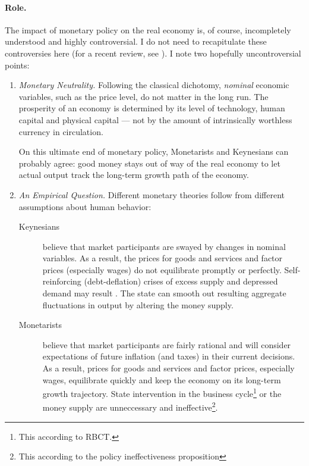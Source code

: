 \paragraph[Role]{Role.} %
The impact of monetary policy on the real economy is, of course, incompletely understood and highly controversial. I do not need to recapitulate these controversies here (for a recent review, see \citealt{Wapshott2011}). I note two hopefully uncontroversial points:

\begin{enumerate}
	\item \emph{Monetary Neutrality.} \label{it:monetary_neutrality} Following the classical dichotomy, \emph{nominal} economic variables, such as the price level, do not matter in the long run. The prosperity of an economy is determined by its level of technology, human capital and physical capital --- not by the amount of intrinsically worthless currency in circulation. 
	
	On this ultimate end of monetary policy, Monetarists and Keynesians can probably agree: good money stays out of way of the real economy to let actual output track the long-term growth path of the economy.

	\item \emph{An Empirical Question.} Different monetary theories follow from different assumptions about human behavior:

	\begin{description}
		\item[Keynesians] believe that market participants are swayed by changes in nominal variables. As a result, the prices for goods and services and factor prices (especially wages) do not equilibrate promptly or perfectly. Self-reinforcing (debt-deflation) crises of excess supply and depressed demand may result \citep{Fisher1933}. The state can smooth out resulting aggregate fluctuations in output by altering the money supply. 
		\item[Monetarists] believe that market participants are fairly rational and will consider expectations of future inflation (and taxes) in their current decisions. As a result, prices for goods and services and factor prices, especially wages, equilibrate quickly and keep the economy on its long-term growth trajectory. State intervention in the business cycle\footnote{
			This according to \gls{RBCT}.} 
		or the money supply are unneccessary and ineffective\footnote{
			This according to the policy ineffectiveness proposition}.
	\end{description}


\end{enumerate}
